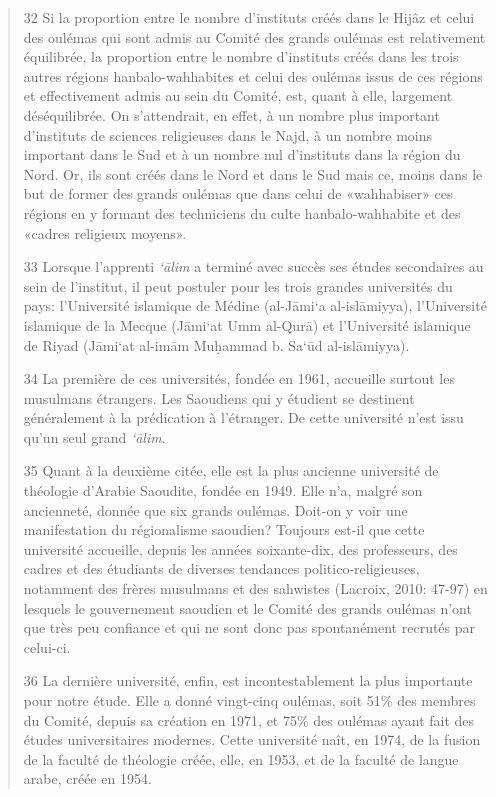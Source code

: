 \begin{quote}
32 Si la proportion entre le nombre d'instituts créés dans le Hijâz et
celui des oulémas qui sont admis au Comité des grands oulémas est
relativement équilibrée, la proportion entre le nombre d'instituts créés
dans les trois autres régions hanbalo-wahhabites et celui des oulémas
issus de ces régions et effectivement admis au sein du Comité, est,
quant à elle, largement déséquilibrée. On s'attendrait, en effet, à un
nombre plus important d'instituts de sciences religieuses dans le Najd,
à un nombre moins important dans le Sud et à un nombre nul d'instituts
dans la région du Nord. Or, ils sont créés dans le Nord et dans le Sud
mais ce, moins dans le but de former des grands oulémas que dans celui
de «wahhabiser» ces régions en y formant des techniciens du culte
hanbalo-wahhabite et des «cadres religieux moyens».

33 Lorsque l'apprenti \emph{`ālim} a terminé avec succès ses études
secondaires au sein de l'institut, il peut postuler pour les trois
grandes universités du pays: l'Université islamique de Médine (al-Jāmi`a
al-islāmiyya), l'Université islamique de la Mecque (Jāmi`at Umm al-Qurā)
et l'Université islamique de Riyad (Jāmi`at al-imām Muḥammad b. Sa`ūd
al-islāmiyya).

34 La première de ces universités, fondée en 1961, accueille surtout les
musulmans étrangers. Les Saoudiens qui y étudient se destinent
généralement à la prédication à l'étranger. De cette université n'est
issu qu'un seul grand \emph{`ālim}.

35 Quant à la deuxième citée, elle est la plus ancienne université de
théologie d'Arabie Saoudite, fondée en 1949. Elle n'a, malgré son
ancienneté, donnée que six grands oulémas. Doit-on y voir une
manifestation du régionalisme saoudien? Toujours est-il que cette
université accueille, depuis les années soixante-dix, des professeurs,
des cadres et des étudiants de diverses tendances politico-religieuses,
notamment des frères musulmans et des sahwistes (Lacroix, 2010: 47-97)
en lesquels le gouvernement saoudien et le Comité des grands oulémas
n'ont que très peu confiance et qui ne sont donc pas spontanément
recrutés par celui-ci.

36 La dernière université, enfin, est incontestablement la plus
importante pour notre étude. Elle a donné vingt-cinq oulémas, soit 51\%
des membres du Comité, depuis sa création en 1971, et 75\% des oulémas
ayant fait des études universitaires modernes. Cette université naît, en
1974, de la fusion de la faculté de théologie créée, elle, en 1953, et
de la faculté de langue arabe, créée en 1954.


\end{quote}
